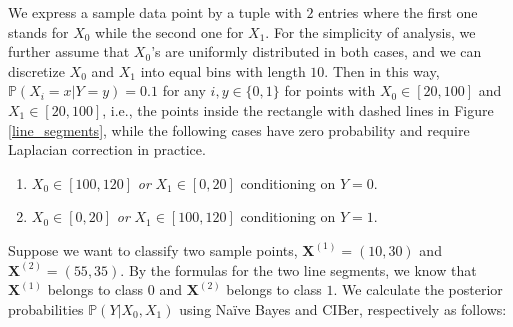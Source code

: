 \documentclass[twoside,11pt]{article}
\begin{document}
We express a sample data point by a tuple with $2$ entries where the first one stands for $X_0$ while the second one for $X_1$. For the simplicity of analysis, we further assume that $X_0$'s are uniformly distributed in both cases, and we can discretize $X_0$ and $X_1$ into equal bins with length $10$. Then in this way, $\mathbb{P}(X_i=x|Y=y)=0.1$ for any $i,y\in\{0,1\}$ for points with $X_0\in[20,100]$ and $X_1\in[20,100]$, i.e., the points inside the rectangle with dashed lines in Figure \ref{line_segments}, while the following cases have zero probability and require Laplacian correction in practice.
\begin{enumerate}
    \item $X_0\in[100,120]$ \textit{or} $X_1\in[0,20]$ conditioning on $Y=0$.
    \item $X_0\in[0,20]$ \textit{or} $X_1\in[100,120]$ conditioning on $Y=1$.
\end{enumerate}
Suppose we want to classify two sample points, $\mathbf{X}^{(1)}=(10,30)$ and $\mathbf{X}^{(2)}=(55,35)$. By the formulas for the two line segments, we know that $\mathbf{X}^{(1)}$ belongs to class $0$ and $\mathbf{X}^{(2)}$ belongs to class $1$. We calculate the posterior probabilities $\mathbb{P}(Y|X_0, X_1)$ using Na\"ive Bayes and CIBer, respectively as follows:
\end{document}
